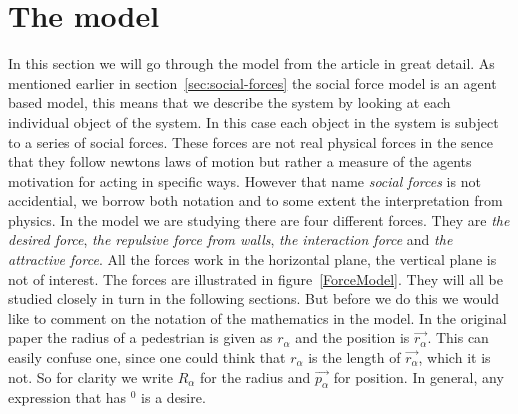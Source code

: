 \section{The model}
\label{sec:the-model}
In this section we will go through the model from the article \cite{self-org} 
in great detail. As mentioned earlier in section~\ref{sec:social-forces} the 
social force model is an agent based model, this means that we describe the 
system by looking at each individual object of the system. In this case each 
object in the system is subject to a series of social forces. These forces 
are not real physical forces in the sence that they follow newtons laws of 
motion but rather a measure of the agents motivation for acting in specific 
ways. However that name \emph{social forces} is not accidential, we borrow 
both notation and to some extent the interpretation from physics. In the model 
we are studying there are four different forces. They are \emph{the desired force}, 
\emph{the repulsive force from walls}, \emph{the interaction force} and \emph{the 
attractive force}. All the forces work in the horizontal plane, the vertical 
plane is not of interest. The forces are illustrated in 
figure~\ref{ForceModel}.  They will all be studied closely in turn in the 
following sections.  But before we do this we would like to comment on the 
notation of the mathematics in the model. In the original paper the radius of 
a pedestrian is given as $r_{\alpha}$ and the position is $\vec{r_{\alpha}}$. 
This can easily confuse one, since one could think that $r_{\alpha}$ is the length 
of $\vec{r_{\alpha}}$, which it is not. So for clarity we write $R_{\alpha}$ for 
the radius and $\vec{p_{\alpha}}$ for position. In general, any expression that 
has $^{0}$ is a desire. 

